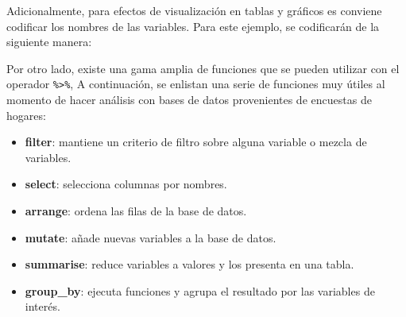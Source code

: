 \documentclass[
  12pt,
]{book}
\newenvironment{Shaded}{\begin{snugshade}}{\end{snugshade}}
\newcommand{\AttributeTok}[1]{\textcolor[rgb]{0.77,0.63,0.00}{#1}}
\newcommand{\DecValTok}[1]{\textcolor[rgb]{0.00,0.00,0.81}{#1}}
\newcommand{\FunctionTok}[1]{\textcolor[rgb]{0.00,0.00,0.00}{#1}}
\newcommand{\NormalTok}[1]{#1}
\newcommand{\OtherTok}[1]{\textcolor[rgb]{0.56,0.35,0.01}{#1}}
\newcommand{\SpecialCharTok}[1]{\textcolor[rgb]{0.00,0.00,0.00}{#1}}
\newcommand{\StringTok}[1]{\textcolor[rgb]{0.31,0.60,0.02}{#1}}
\providecommand{\tightlist}{%
  \setlength{\itemsep}{0pt}\setlength{\parskip}{0pt}}
\begin{document}
Adicionalmente, para efectos de visualización en tablas y gráficos es conviene codificar los nombres de las variables. Para este ejemplo, se codificarán de la siguiente manera:

\begin{Shaded}
\end{Shaded}

Por otro lado, existe una gama amplia de funciones que se pueden utilizar con el operador \texttt{\%\textgreater{}\%}, A continuación, se enlistan una serie de funciones muy útiles al momento de hacer análisis con bases de datos provenientes de encuestas de hogares:

\begin{itemize}
\tightlist
\item
  \textbf{filter}: mantiene un criterio de filtro sobre alguna variable o mezcla de variables.
\item
  \textbf{select}: selecciona columnas por nombres.
\item
  \textbf{arrange}: ordena las filas de la base de datos.
\item
  \textbf{mutate}: añade nuevas variables a la base de datos.
\item
  \textbf{summarise}: reduce variables a valores y los presenta en una tabla.
\item
  \textbf{group\_by}: ejecuta funciones y agrupa el resultado por las variables de interés.
\end{itemize}
\end{document}
